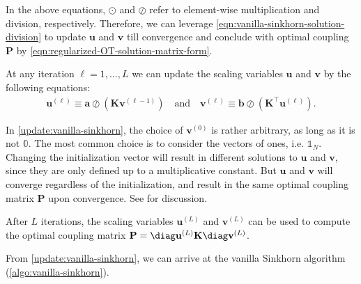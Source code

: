 In the above equations, $\odot$ and $\oslash$ refer to element-wise multiplication and division, respectively.
Therefore, we can leverage \cref{eqn:vanilla-sinkhorn-solution-division} to update $\mathbf{u}$ and $\mathbf{v}$
till convergence and conclude with optimal coupling $\mathbf{P}$ by \cref{eqn:regularized-OT-solution-matrix-form}.


\begin{update}\label{update:vanilla-sinkhorn}
  At any iteration $\ell = 1, \ldots, L$
  we can update the scaling variables $\mathbf{u}$ and $\mathbf{v}$ by the following equations:
  \begin{equation}
    \begin{aligned}
      \mathbf{u}^{(\ell)} \equiv \mathbf{a} \oslash (\mathbf{K}\mathbf{v}^{(\ell-1)})
      \quad\text{and}\quad
      \mathbf{v}^{(\ell)} \equiv \mathbf{b} \oslash (\mathbf{K}^\top \mathbf{u}^{(\ell)}).
    \end{aligned}
  \end{equation}
\end{update}

\begin{remark}
  In \cref{update:vanilla-sinkhorn}, the choice of $\mathbf{v}^{(0)}$ is rather arbitrary,
  as long as it is not $\mathbb{0}$.
  The most common choice is to consider the vectors of ones, i.e. $\mathbb{1}_N$.
  Changing the initialization vector will result in different solutions to $\mathbf{u}$ and $\mathbf{v}$,
  since they are only defined up to a multiplicative constant.
  But $\mathbf{u}$ and $\mathbf{v}$ will converge regardless of the initialization,
  and result in the same optimal coupling matrix $\mathbf{P}$ upon convergence.
  See \citet[p.82]{peyre2019} for discussion.
\end{remark}

After $L$ iterations, the scaling variables $\mathbf{u}^{(L)}$ and $\mathbf{v}^{(L)}$ can be used to compute the
optimal coupling matrix $\mathbf{P} = \diag\mathbf{u}^{(L)} \mathbf{K} \diag \mathbf{v}^{(L)}$.

From \cref{update:vanilla-sinkhorn}, we can arrive at the vanilla Sinkhorn algorithm (\cref{algo:vanilla-sinkhorn}).

